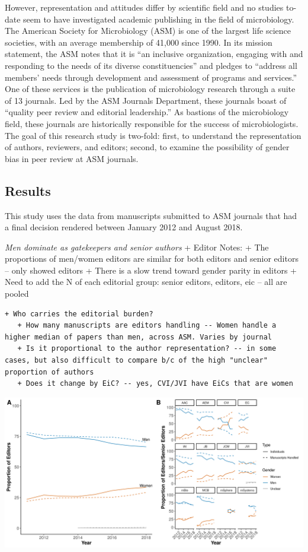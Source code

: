 \documentclass[11pt,]{article}
\begin{document}
However, representation and attitudes differ by scientific field and no
studies to-date seem to have investigated academic publishing in the
field of microbiology. The American Society for Microbiology (ASM) is
one of the largest life science societies, with an average membership of
41,000 since 1990. In its mission statement, the ASM notes that it is
``an inclusive organization, engaging with and responding to the needs
of its diverse constituencies'' and pledges to ``address all members'
needs through development and assessment of programs and services.'' One
of these services is the publication of microbiology research through a
suite of 13 journals. Led by the ASM Journals Department, these journals
boast of ``quality peer review and editorial leadership.'' As bastions
of the microbiology field, these journals are historically responsible
for the success of microbiologists. The goal of this research study is
two-fold: first, to understand the representation of authors, reviewers,
and editors; second, to examine the possibility of gender bias in peer
review at ASM journals.

\subsection{Results}\label{results}

This study uses the data from manuscripts submitted to ASM journals that
had a final decision rendered between January 2012 and August 2018.

\emph{Men dominate as gatekeepers and senior authors} + Editor Notes: +
The proportions of men/women editors are similar for both editors and
senior editors -- only showed editors + There is a slow trend toward
gender parity in editors + Need to add the N of each editorial group:
senior editors, editors, eic -- all are pooled

\begin{verbatim}
+ Who carries the editorial burden?
   + How many manuscripts are editors handling -- Women handle a higher median of papers than men, across ASM. Varies by journal
   + Is it proportional to the author representation? -- in some cases, but also difficult to compare b/c of the high "unclear" proportion of authors
   + Does it change by EiC? -- yes, CVI/JVI have EiCs that are women
\end{verbatim}

\includegraphics{Figure_1.png}
\end{document}
